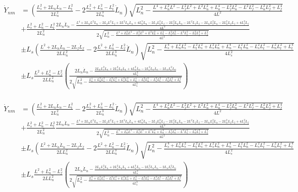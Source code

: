 \documentclass[11pt, landscape]{article}
\begin{document}
\begin{align}
  \dot{Y}_{nm} &= \left(\frac{L_{s}^2+2L_{n}\dot{L}_n - L_{t}^2}{2L^2_{n}} - 2\frac{L_{s}^2+L_{n}^2-L_{t}^2}{2L^3_{n}}\dot{L}_n\right) \sqrt{L_n^2-\frac{L^4 + L_n^2L^2 - L_f^2L^2 + L^2L_{n}^2 + L_{n}^4 - L_f^2L_{n}^2 - L^2L_{f}^2 - L_n^2L_{f}^2 + L_{f}^4}{4L^2}}\\
  &+ \frac{L_{s}^2+L_{n}^2-L_{t}^2}{2L^2_{n}}   \frac{2L_n\dot{L}_n - \frac{L^4 + 2L_nL^2\dot{L}_n - 2L_fL^2\dot{L}_f + 2L^2L_{n}\dot{L}_n + 4L_{n}^3\dot{L}_n - 2L_fL_{n}^2\dot{L}_f - 2L_f^2L_{n}\dot{L}_n - 2L^2L_{f}\dot{L}_f - 2L_nL_{f}^2\dot{L}_n - 2L_n^2L_{f}\dot{L}_f + 4L_{f}^3\dot{L}_f}{4L^2}}{2\sqrt{L_n^2-\frac{L^4 + L_n^2L^2 - L_f^2L^2 + L^2L_{n}^2 + L_{n}^4 - L_f^2L_{n}^2 - L^2L_{f}^2 - L_n^2L_{f}^2 + L_{f}^4}{4L^2}}}\\
  &\pm L_s\left(\frac{L^2+2L_{n}\dot{L}_n - 2L_{f}\dot{L}_f}{2LL^2_n} - 2\frac{L^2+L_{n}^2-L_{f}^2}{2LL^3_n}\dot{L}_n\right) \sqrt{L^2_n - \frac{L_{s}^4 + L_n^2L_{s}^2 - L_t^2L_{s}^2 + L_s^2L_{n}^2 + L_{n}^4 - L_t^2L_{n}^2 - L_s^2L_{t}^2 - L_n^2L_{t}^2 + L_{t}^4}{4L^2_{s}}}\\  
  &\pm L_s\frac{L^2+L_{n}^2-L_{f}^2}{2LL^2_{n}} \left(\frac{2L_n\dot{L}_n - \frac{2L_nL_{s}^2\dot{L}_n + 2L_s^2L_{n}\dot{L}_n + 4L_{n}^3\dot{L}_n - 2L_t^2L_{n}\dot{L}_n - 2L_nL_{t}^2\dot{L}_n}{4L^2_{s}}}{2\sqrt{L^2_n - \frac{L_{s}^4 + L_n^2L_{s}^2 - L_t^2L_{s}^2 + L_s^2L_{n}^2 + L_{n}^4 - L_t^2L_{n}^2 - L_s^2L_{t}^2 - L_n^2L_{t}^2 + L_{t}^4}{4L^2_{s}}}} \right)\\
\end{align}

\begin{align}
  \dot{Y}_{nm} &= \left(\frac{L_{s}^2+2L_{n}\dot{L}_n - L_{t}^2}{2L^2_{n}} - 2\frac{L_{s}^2+L_{n}^2-L_{t}^2}{2L^3_{n}}\dot{L}_n\right) \sqrt{L_n^2-\frac{L^4 + L_n^2L^2 - L_f^2L^2 + L^2L_{n}^2 + L_{n}^4 - L_f^2L_{n}^2 - L^2L_{f}^2 - L_n^2L_{f}^2 + L_{f}^4}{4L^2}}\\
  &+ \frac{L_{s}^2+L_{n}^2-L_{t}^2}{2L^2_{n}}   \frac{2L_n\dot{L}_n - \frac{L^4 + 2L_nL^2\dot{L}_n - 2L_fL^2\dot{L}_f + 2L^2L_{n}\dot{L}_n + 4L_{n}^3\dot{L}_n - 2L_fL_{n}^2\dot{L}_f - 2L_f^2L_{n}\dot{L}_n - 2L^2L_{f}\dot{L}_f - 2L_nL_{f}^2\dot{L}_n - 2L_n^2L_{f}\dot{L}_f + 4L_{f}^3\dot{L}_f}{4L^2}}{2\sqrt{L_n^2-\frac{L^4 + L_n^2L^2 - L_f^2L^2 + L^2L_{n}^2 + L_{n}^4 - L_f^2L_{n}^2 - L^2L_{f}^2 - L_n^2L_{f}^2 + L_{f}^4}{4L^2}}}\\
  &\pm L_s\left(\frac{L^2+2L_{n}\dot{L}_n - 2L_{f}\dot{L}_f}{2LL^2_n} - 2\frac{L^2+L_{n}^2-L_{f}^2}{2LL^3_n}\dot{L}_n\right) \sqrt{L^2_n - \frac{L_{s}^4 + L_n^2L_{s}^2 - L_t^2L_{s}^2 + L_s^2L_{n}^2 + L_{n}^4 - L_t^2L_{n}^2 - L_s^2L_{t}^2 - L_n^2L_{t}^2 + L_{t}^4}{4L^2_{s}}}\\  
  &\pm L_s\frac{L^2+L_{n}^2-L_{f}^2}{2LL^2_{n}} \left(\frac{2L_n\dot{L}_n - \frac{2L_nL_{s}^2\dot{L}_n + 2L_s^2L_{n}\dot{L}_n + 4L_{n}^3\dot{L}_n - 2L_t^2L_{n}\dot{L}_n - 2L_nL_{t}^2\dot{L}_n}{4L^2_{s}}}{2\sqrt{L^2_n - \frac{L_{s}^4 + L_n^2L_{s}^2 - L_t^2L_{s}^2 + L_s^2L_{n}^2 + L_{n}^4 - L_t^2L_{n}^2 - L_s^2L_{t}^2 - L_n^2L_{t}^2 + L_{t}^4}{4L^2_{s}}}} \right)\\
\end{align}
\end{document}
